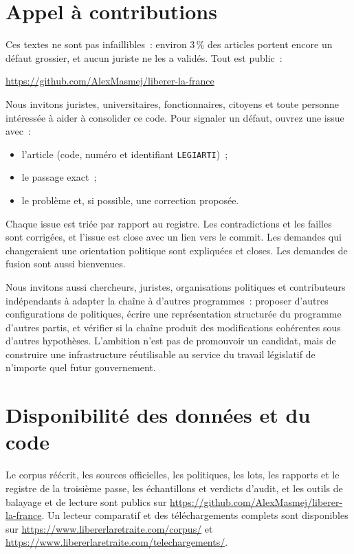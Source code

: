 \documentclass[11pt,a4paper]{article}
\begin{document}
\section*{Appel à contributions}

Ces textes ne sont pas infaillibles~: environ 3\,\% des articles portent encore un défaut grossier, et aucun juriste ne les a validés. Tout est public~:
\begin{center}\url{https://github.com/AlexMasmej/liberer-la-france}\end{center}

Nous invitons juristes, universitaires, fonctionnaires, citoyens et toute personne intéressée à aider à consolider ce code. Pour signaler un défaut, ouvrez une issue avec~:
\begin{itemize}
  \item l'article (code, numéro et identifiant \texttt{LEGIARTI})~;
  \item le passage exact~;
  \item le problème et, si possible, une correction proposée.
\end{itemize}
Chaque issue est triée par rapport au registre. Les contradictions et les failles sont corrigées, et l'issue est close avec un lien vers le commit. Les demandes qui changeraient une orientation politique sont expliquées et closes. Les demandes de fusion sont aussi bienvenues.

Nous invitons aussi chercheurs, juristes, organisations politiques et contributeurs indépendants à adapter la chaîne à d'autres programmes~: proposer d'autres configurations de politiques, écrire une représentation structurée du programme d'autres partis, et vérifier si la chaîne produit des modifications cohérentes sous d'autres hypothèses. L'ambition n'est pas de promouvoir un candidat, mais de construire une infrastructure réutilisable au service du travail législatif de n'importe quel futur gouvernement.

\section*{Disponibilité des données et du code}

Le corpus réécrit, les sources officielles, les politiques, les lots, les rapports et le registre de la troisième passe, les échantillons et verdicts d'audit, et les outils de balayage et de lecture sont publics sur \url{https://github.com/AlexMasmej/liberer-la-france}. Un lecteur comparatif et des téléchargements complets sont disponibles sur \url{https://www.libererlaretraite.com/corpus/} et \url{https://www.libererlaretraite.com/telechargements/}.
\end{document}
